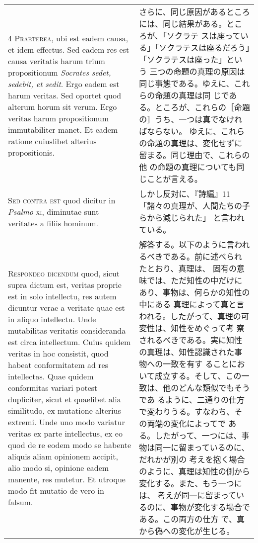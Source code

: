 \documentclass[10pt]{jsarticle} %
\begin{document}
\begin{longtable}{p{21em}p{21em}}
\\

{\scshape 4 Praeterea}, ubi est eadem causa, et idem effectus. Sed
eadem res est causa veritatis harum trium propositionum {\itshape
Socrates sedet, sedebit, et sedit}. Ergo eadem est harum veritas. Sed
oportet quod alterum horum sit verum. Ergo veritas harum propositionum
immutabiliter manet. Et eadem ratione cuiuslibet alterius
propositionis.

&

さらに、同じ原因があるところには、同じ結果がある。ところが、「ソクラテ
スは座っている」「ソクラテスは座るだろう」「ソクラテスは座った」という
三つの命題の真理の原因は同じ事態である。ゆえに、これらの命題の真理は同
じである。ところが、これらの［命題の］うち、一つは真でなければならない。
ゆえに、これらの命題の真理は、変化せずに留まる。同じ理由で、これらの他
の命題の真理についても同じことが言える。

\\

{\scshape Sed contra est} quod dicitur in {\itshape Psalmo} {\scshape
xi}, diminutae sunt veritates a filiis hominum.

&

 しかし反対に、『詩編』11「諸々の真理が、人間たちの子らから減じられた」
 と言われている。


\\

{\scshape Respondeo dicendum} quod, sicut supra dictum est, veritas
proprie est in solo intellectu, res autem dicuntur verae a veritate
quae est in aliquo intellectu. Unde mutabilitas veritatis consideranda
est circa intellectum. Cuius quidem veritas in hoc consistit, quod
habeat conformitatem ad res intellectas. Quae quidem conformitas
variari potest dupliciter, sicut et quaelibet alia similitudo, ex
mutatione alterius extremi. Unde uno modo variatur veritas ex parte
intellectus, ex eo quod de re eodem modo se habente aliquis aliam
opinionem accipit, alio modo si, opinione eadem manente, res
mutetur. Et utroque modo fit mutatio de vero in falsum.

&

解答する。以下のように言われるべきである。前に述べられたとおり、真理は、
固有の意味では、ただ知性の中だけにあり、事物は、何らかの知性の中にある
真理によって真と言われる。したがって、真理の可変性は、知性をめぐって考
察されるべきである。実に知性の真理は、知性認識された事物への一致を有す
ることにおいて成立する。そして、この一致は、他のどんな類似でもそうであ
るように、二通りの仕方で変わりうる。すなわち、その両端の変化によってで
ある。したがって、一つには、事物は同一に留まっているのに、だれかが別の
考えを抱く場合のように、真理は知性の側から変化する。また、もう一つには、
考えが同一に留まっているのに、事物が変化する場合である。この両方の仕方
で、真から偽への変化が生じる。


\end{longtable}
\end{document}
